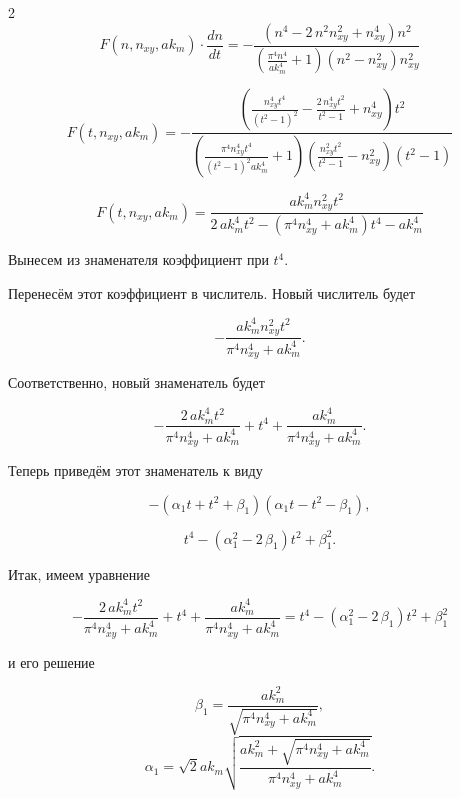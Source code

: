 \documentclass[twoside, 10pt]{article}
\begin{document}
\begin{multicols}{2}
\[F\left(n, n_{xy}, ak_m\right) \cdot \frac{dn}{dt} = -\frac{{\left(n^{4} - 2 \, n^{2} n_{\mathit{xy}}^{2} + n_{\mathit{xy}}^{4}\right)} n^{2}}{{\left(\frac{\pi^{4} n^{4}}{\mathit{ak}_{m}^{4}} + 1\right)} {\left(n^{2} - n_{\mathit{xy}}^{2}\right)} n_{\mathit{xy}}^{2}}\]

\[F\left(t, n_{xy}, ak_m\right) = -\frac{{\left(\frac{n_{\mathit{xy}}^{4} t^{4}}{{\left(t^{2} - 1\right)}^{2}} - \frac{2 \, n_{\mathit{xy}}^{4} t^{2}}{t^{2} - 1} + n_{\mathit{xy}}^{4}\right)} t^{2}}{{\left(\frac{\pi^{4} n_{\mathit{xy}}^{4} t^{4}}{{\left(t^{2} - 1\right)}^{2} \mathit{ak}_{m}^{4}} + 1\right)} {\left(\frac{n_{\mathit{xy}}^{2} t^{2}}{t^{2} - 1} - n_{\mathit{xy}}^{2}\right)} {\left(t^{2} - 1\right)}}\]

\[F\left(t, n_{xy}, ak_m\right) = \frac{\mathit{ak}_{m}^{4} n_{\mathit{xy}}^{2} t^{2}}{2 \, \mathit{ak}_{m}^{4} t^{2} - {\left(\pi^{4} n_{\mathit{xy}}^{4} + \mathit{ak}_{m}^{4}\right)} t^{4} - \mathit{ak}_{m}^{4}}\]

    Вынесем из знаменателя коэффициент при \(t^4\).

    Перенесём этот коэффициент в числитель. Новый числитель будет

    \[-\frac{\mathit{ak}_{m}^{4} n_{\mathit{xy}}^{2} t^{2}}{\pi^{4} n_{\mathit{xy}}^{4} + \mathit{ak}_{m}^{4}}.\]

    Соответственно, новый знаменатель будет

    \[-\frac{2 \, \mathit{ak}_{m}^{4} t^{2}}{\pi^{4} n_{\mathit{xy}}^{4} + \mathit{ak}_{m}^{4}} + t^{4} + \frac{\mathit{ak}_{m}^{4}}{\pi^{4} n_{\mathit{xy}}^{4} + \mathit{ak}_{m}^{4}}.\]

    Теперь приведём этот знаменатель к виду

    \[-{\left(\alpha_{1} t + t^{2} + \beta_{1}\right)} {\left(\alpha_{1} t - t^{2} - \beta_{1}\right)},\]

\[t^{4} - {\left(\alpha_{1}^{2} - 2 \, \beta_{1}\right)} t^{2} + \beta_{1}^{2}.\]


    Итак, имеем уравнение

\[-\frac{2 \, \mathit{ak}_{m}^{4} t^{2}}{\pi^{4} n_{\mathit{xy}}^{4} + \mathit{ak}_{m}^{4}} + t^{4} + \frac{\mathit{ak}_{m}^{4}}{\pi^{4} n_{\mathit{xy}}^{4} + \mathit{ak}_{m}^{4}} = t^{4} - {\left(\alpha_{1}^{2} - 2 \, \beta_{1}\right)} t^{2} + \beta_{1}^{2}\]

и его решение

\begin{equation}\beta_{1} = \frac{\mathit{ak}_{m}^{2}}{\sqrt{\pi^{4} n_{\mathit{xy}}^{4} + \mathit{ak}_{m}^{4}}},\end{equation} \begin{equation}\alpha_{1} = \sqrt{2} \mathit{ak}_{m} \sqrt{\frac{\mathit{ak}_{m}^{2} + \sqrt{\pi^{4} n_{\mathit{xy}}^{4} + \mathit{ak}_{m}^{4}}}{\pi^{4} n_{\mathit{xy}}^{4} + \mathit{ak}_{m}^{4}}}.\end{equation}


\end{multicols}
\end{document}
